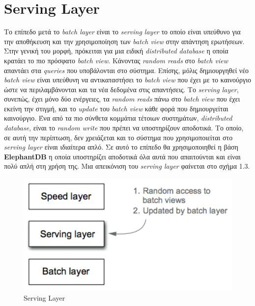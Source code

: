\section{Serving Layer}
Το επίπεδο μετά το \textit{batch layer} είναι το \textit{serving layer} το οποίο είναι υπεύθυνο για την αποθήκευση και την χρησιμοποίηση των \textit{batch view} στην απάντηση ερωτήσεων. Στην γενική του μορφή, πρόκειται για μια ειδική \textit{distributed database} η οποία κρατάει το πιο πρόσφατο \textit{batch view}. Κάνοντας \textit{random reads} στο \textit{batch view} απαντάει στα \textit{queries} που υποβάλονται στο σύστημα. Επίσης, μόλις δημιουργηθεί νέο \textit{batch view} είναι υπεύθυνη να αντικαταστήσει το \textit{batch view} που έχει με το καινούργιο ώστε να περιλαμβάνονται και τα νέα δεδομένα στις απαντήσεις.
\newline
Το \textit{serving layer}, συνεπώς, έχει μόνο δύο ενέργειες, τα \textit{random reads} πάνω στο \textit{batch view} που έχει εκείνη την στιγμή, και το \textit{update} του \textit{batch view} κάθε φορά που δημιουργείται καινούργιο. Ένα από τα πιο σύνθετα κομμάτια τέτοιων συστημάτων, \textit{distributed database}, είναι το \textit{random write} που πρέπει να υποστηρίζουν αποδοτικά. Το οποίο, σε αυτή την περίπτωση, δεν χρειάζεται και το σύστημα που χρησιμοποιείται στο  \textit{serving layer} είναι ιδιαίτερα απλό. Σε αυτό το επίπεδο θα χρησιμοποιηθεί η βάση \textbf{ElephantDB} η οποία υποστηρίζει αποδοτικά όλα αυτά που απαιτούνται και είναι πολύ απλή στη χρήση της.
\newline
Μια απεικόνιση του \textit{serving layer} φαίνεται στο σχήμα 1.3.
\begin{figure}[t]
\caption{Serving Layer}
\includegraphics[width=12cm]{images/serving_layer.png}
\centering
\end{figure}
\clearpage


